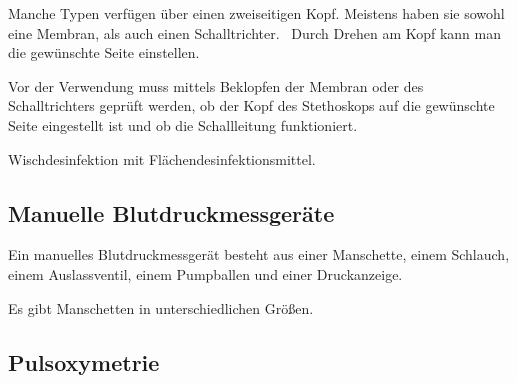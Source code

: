{
Manche Typen verfügen über einen zweiseitigen Kopf. Meistens haben sie sowohl
eine Membran, als auch einen Schalltrichter.~ Durch Drehen am Kopf kann man die gewünschte Seite einstellen. 
}{}{}{}{}

{
Vor der Verwendung muss mittels Beklopfen der Membran oder des
Schalltrichters geprüft werden, ob der Kopf des Stethoskops auf die gewünschte
Seite eingestellt ist und ob die Schallleitung funktioniert. 

}{}{}{}{}

{
\TakeNotesMedium
}{}{}{}{}

{
Wischdesinfektion mit Flächendesinfektionsmittel.
}{}{}{}{}

{
\TakeNotesMedium
}{}{}{}{}



\subsection{Manuelle Blutdruckmessgeräte}

Ein manuelles Blutdruckmessgerät besteht aus einer
Manschette, einem Schlauch, einem Auslassventil, einem Pumpballen und einer
Druckanzeige. 

Es gibt Manschetten in unterschiedlichen Größen.

{\TakeNotesLarge}





\subsection{Pulsoxymetrie}

